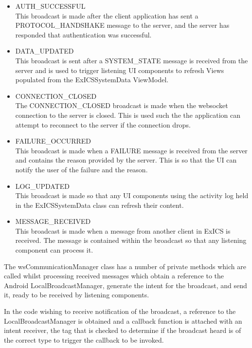 \begin{itemize}

\item AUTH\_SUCCESSFUL\\
	This broadcast is made after the client application has sent a PROTOCOL\_HANDSHAKE message to the server, and the server has responded that authentication was successful.

\item DATA\_UPDATED\\
	This broadcast is sent after a SYSTEM\_STATE message is received from the server and is used to trigger listening UI components to refresh Views populated from the ExICSSystemData ViewModel.

\item CONNECTION\_CLOSED\\
	The CONNECTION\_CLOSED broadcast is made when the websocket connection to the server is closed.  This is used such the the application can attempt to reconnect to the server if the connection drops.

\item FAILURE\_OCCURRED\\
	This broadcast is made when a FAILURE message is received from the server and contains the reason provided by the server.  This is so that the UI can notify the user of the failure and the reason.

\item LOG\_UPDATED\\
	This broadcast is made so that any UI components using the activity log held in the ExICSSystemData class can refresh their content.

\item MESSAGE\_RECEIVED\\
	This broadcast is made when a message from another client in ExICS is received.  The message is contained within the broadcast so that any listening component can process it.

\end{itemize}

The wsCommunicationManager class has a number of private methods which are called whilst processing received messages which obtain a reference to the Android LocalBroadcastManager, generate the intent for the broadcast, and send it, ready to be received by listening components.

In the code wishing to receive notification of the broadcast, a reference to the LocalBroadcastManager is obtained and a callback function is attached with an intent receiver, the tag that is checked to determine if the broadcast heard is of the correct type to trigger the callback to be invoked.


